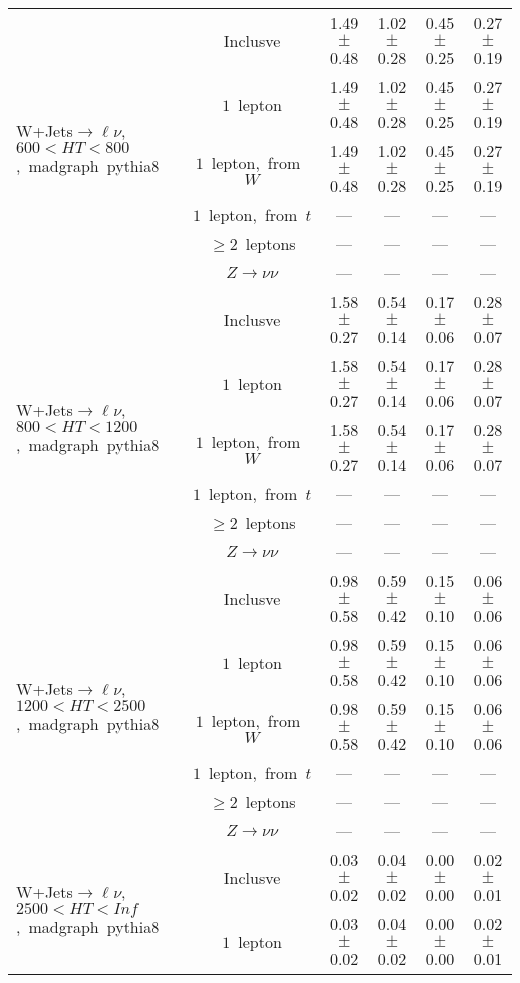 \documentclass{article}
\begin{document}
\begin{longtable}{|l|c|c|c|c|c|}
\hline 
\multirow{6}{*}{W+Jets$\rightarrow\ell\nu$,~$600<HT<800$,~madgraph~pythia8} & Inclusve  & 1.49 $\pm$ 0.48  & 1.02 $\pm$ 0.28  & 0.45 $\pm$ 0.25  & 0.27 $\pm$ 0.19 \\* 
 & $1$~lepton  & 1.49 $\pm$ 0.48  & 1.02 $\pm$ 0.28  & 0.45 $\pm$ 0.25  & 0.27 $\pm$ 0.19 \\* 
 & $1$~lepton,~from~$W$  & 1.49 $\pm$ 0.48  & 1.02 $\pm$ 0.28  & 0.45 $\pm$ 0.25  & 0.27 $\pm$ 0.19 \\* 
 & $1$~lepton,~from~$t$  & ---  & ---  & ---  & --- \\* 
 & $\ge2$~leptons  & ---  & ---  & ---  & --- \\* 
 & $Z\rightarrow\nu\nu$  & ---  & ---  & ---  & --- \\* 
\hline 
\multirow{6}{*}{W+Jets$\rightarrow\ell\nu$,~$800<HT<1200$,~madgraph~pythia8} & Inclusve  & 1.58 $\pm$ 0.27  & 0.54 $\pm$ 0.14  & 0.17 $\pm$ 0.06  & 0.28 $\pm$ 0.07 \\* 
 & $1$~lepton  & 1.58 $\pm$ 0.27  & 0.54 $\pm$ 0.14  & 0.17 $\pm$ 0.06  & 0.28 $\pm$ 0.07 \\* 
 & $1$~lepton,~from~$W$  & 1.58 $\pm$ 0.27  & 0.54 $\pm$ 0.14  & 0.17 $\pm$ 0.06  & 0.28 $\pm$ 0.07 \\* 
 & $1$~lepton,~from~$t$  & ---  & ---  & ---  & --- \\* 
 & $\ge2$~leptons  & ---  & ---  & ---  & --- \\* 
 & $Z\rightarrow\nu\nu$  & ---  & ---  & ---  & --- \\* 
\hline 
\multirow{6}{*}{W+Jets$\rightarrow\ell\nu$,~$1200<HT<2500$,~madgraph~pythia8} & Inclusve  & 0.98 $\pm$ 0.58  & 0.59 $\pm$ 0.42  & 0.15 $\pm$ 0.10  & 0.06 $\pm$ 0.06 \\* 
 & $1$~lepton  & 0.98 $\pm$ 0.58  & 0.59 $\pm$ 0.42  & 0.15 $\pm$ 0.10  & 0.06 $\pm$ 0.06 \\* 
 & $1$~lepton,~from~$W$  & 0.98 $\pm$ 0.58  & 0.59 $\pm$ 0.42  & 0.15 $\pm$ 0.10  & 0.06 $\pm$ 0.06 \\* 
 & $1$~lepton,~from~$t$  & ---  & ---  & ---  & --- \\* 
 & $\ge2$~leptons  & ---  & ---  & ---  & --- \\* 
 & $Z\rightarrow\nu\nu$  & ---  & ---  & ---  & --- \\* 
\hline 
\multirow{6}{*}{W+Jets$\rightarrow\ell\nu$,~$2500<HT<Inf$,~madgraph~pythia8} & Inclusve  & 0.03 $\pm$ 0.02  & 0.04 $\pm$ 0.02  & 0.00 $\pm$ 0.00  & 0.02 $\pm$ 0.01 \\* 
 & $1$~lepton  & 0.03 $\pm$ 0.02  & 0.04 $\pm$ 0.02  & 0.00 $\pm$ 0.00  & 0.02 $\pm$ 0.01 \\* 

\end{longtable}
\end{document}
